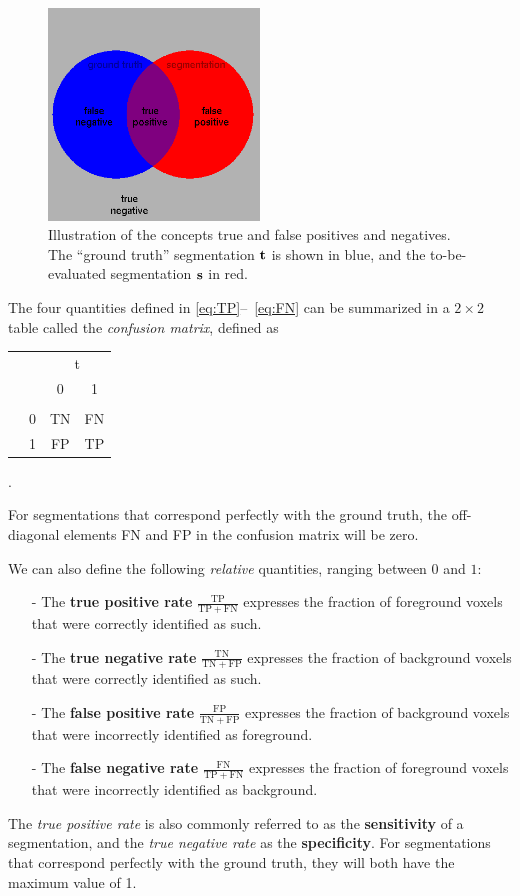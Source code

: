 \documentclass[10pt,twoside]{book}
\begin{document}
\begin{figure}
  \centering
  \includegraphics[width=0.50\textwidth]{trueFalsePosNeg}
  \caption{Illustration of the concepts true and false positives and negatives. The ``ground truth'' segmentation $\mathbf{t}$ is shown in blue, and the to-be-evaluated segmentation $\mathbf{s}$ in red.}
  \label{fig:trueFalsePosNeg}
\end{figure}


The four quantities defined in \eqref{eq:TP}--~\eqref{eq:FN} can be summarized in a $2\times2$ table called the \emph{confusion matrix}, defined as
\begin{center}
  \begin{tabular}{cc|cc}
      & & \multicolumn{2}{c}{t} \\
      & & 0 & 1 \\
    \hline 
    & & & \\
    \raisebox{-1ex}{s}  & 0 & TN & FN \\
       & 1 & FP & TP \\
  \end{tabular}
\quad .
\end{center}
For segmentations that correspond perfectly with the ground truth, the off-diagonal elements FN and FP in the confusion matrix will be zero. 

We can also define the following \emph{relative} quantities, ranging between $0$ and $1$: 
\begin{itemize}
 \item[-] The \textbf{true positive rate} $\frac{\mathrm{TP}}{\mathrm{TP+FN}}$ expresses the fraction of foreground voxels that were correctly identified as such.
 \item[-] The \textbf{true negative rate} $\frac{\mathrm{TN}}{\mathrm{TN+FP}}$ expresses the fraction of background voxels that were correctly identified as such.
 \item[-] The \textbf{false positive rate} $\frac{\mathrm{FP}}{\mathrm{TN+FP}}$ expresses the fraction of background voxels that were incorrectly identified as foreground.
 \item[-] The \textbf{false negative rate} $\frac{\mathrm{FN}}{\mathrm{TP+FN}}$ expresses the fraction of foreground voxels that were incorrectly identified as background.
\end{itemize}
The \emph{true positive rate} is also commonly referred to as the \textbf{sensitivity} of a segmentation, and the \emph{true negative rate} as the \textbf{specificity}. For segmentations that 
correspond perfectly with the ground truth, they will both have the maximum value of 1.
\end{document}
